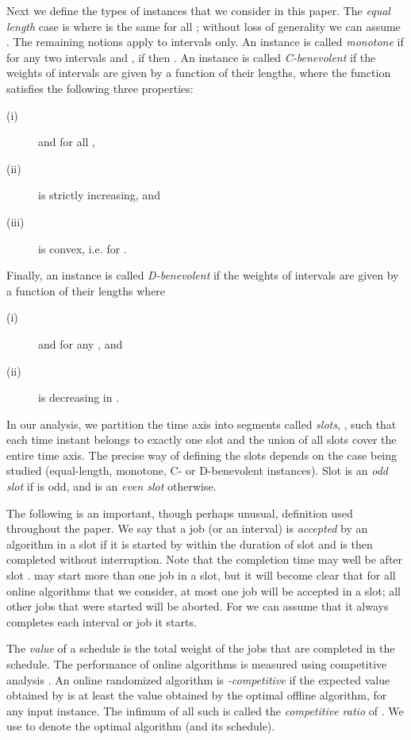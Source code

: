 \documentclass[11pt]{article}
\begin{document}
Next we define the types of instances that we consider in this paper.
The {\it equal length} case is where  is the same for all ;
without loss of generality we can assume .
The remaining notions apply to intervals only.
An instance is called {\it monotone} if for any two intervals  and
, if  then .  
An instance is called {\it C-benevolent} if the weights of intervals are
given by a function  of their lengths, where the function  satisfies
the following three properties: 
\begin{description}
\item[(i)]
 and  for all , 
\item[(ii)]
 is strictly increasing, and 
\item[(iii)]
 is convex,
i.e.   for 
.
\end{description}
Finally, an instance is called {\it D-benevolent} if the weights of 
intervals are given by a function  of their lengths where
\begin{description}
\item[(i)]
 and  for any , and
\item[(ii)]
 is decreasing in .
\end{description}

In our analysis, we partition the time axis into segments called
{\it slots}, ,
such that each time instant belongs to exactly one slot
and the union of all slots cover the entire time axis.
The precise way of defining the slots depends on the case being studied 
(equal-length, monotone, C- or D-benevolent instances).
Slot  is an {\it odd slot} if  is odd, and is an
{\it even slot} otherwise.  

The following is an important, though perhaps unusual, definition 
used throughout the paper.
We say that a job (or an interval) is {\it accepted} by an algorithm  
in a slot 
if it is started by  within the duration of slot  and is then 
completed without interruption.  
Note that the completion time may well be after slot .
 may start more than one job in a slot,
but it will become clear that for all online algorithms that we consider,
at most one job will be accepted in a slot; all other jobs that were started
will be aborted.
For  we can assume that it always completes each
interval or job it starts.

The {\it value} of a schedule is the total weight of the jobs that are 
completed in the schedule.
The performance of online algorithms is measured using
competitive analysis \cite{BorElY98}.  
An online randomized algorithm  is {\it -competitive}
if the expected value obtained by  is at least 
the value obtained by the optimal offline algorithm, for any input instance.
The infimum of all such  is called the {\it competitive ratio} of .
We use  to denote the optimal algorithm (and its schedule).
\end{document}
